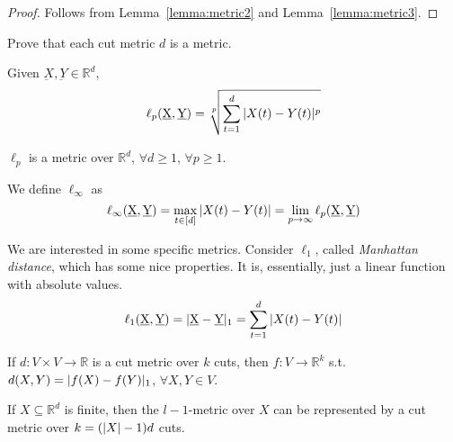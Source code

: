     \begin{proof}
        Follows from Lemma~\ref{lemma:metric2} and Lemma~\ref{lemma:metric3}.
    \end{proof}

    \begin{exercise}
        Prove that each cut metric $d$ is a metric.
    \end{exercise}

    \begin{definition}
        Given $\underbar{X}, \underbar{Y} \in \mathbb{R}^d$,
        \[ \ell_p(\underbar{X}, \underbar{Y}) = \sqrt[p]{\sum_{t=1}^{d} \vert X(t) - Y(t) \vert^p} \]
    \end{definition}

    \begin{theorem}
        $\ell_p$ is a metric over $\mathbb{R}^d$, $\forall d \geq 1$, $\forall p \geq 1$.
    \end{theorem}

    We define $\ell_\infty$ as
    \[ \ell_\infty(\underbar{X}, \underbar{Y}) = \max_{t \in [d]} \vert X(t) - Y(t) \vert = \lim_{p \rightarrow \infty} \ell_p(\underbar{X}, \underbar{Y}) \]

    We are interested in some specific metrics.
    Consider $\ell_1$, called \textit{Manhattan distance}, which has some nice properties.
    It is, essentially, just a linear function with absolute values.
    \[ \ell_1(\underbar{X}, \underbar{Y}) = \vert \underbar{X} - \underbar{Y} \vert_1 = \sum_{t=1}^{d} \vert X(t) - Y(t) \vert \]

    \begin{lemma}\label{lemma:metric4}
        If $d : V \times V \rightarrow \mathbb{R}$ is a cut metric over $k$ cuts, then $f : V \rightarrow \mathbb{R}^k$ s.t. $d(X,Y) = \vert f(X) - f(Y) \vert_1$, $\forall X,Y \in V$.

        If $X \subseteq \mathbb{R}^d$ is finite, then the $l-1$-metric over $X$ can be represented by a cut metric over $k = (\vert X \vert-1)d$ cuts.
    \end{lemma}

